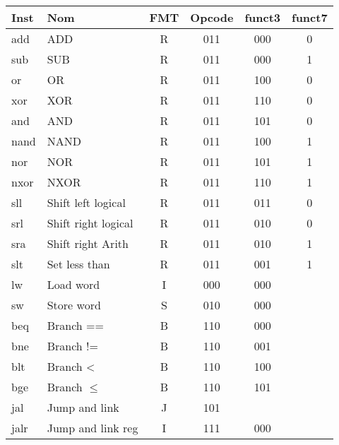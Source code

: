 \documentclass[a4paper]{article}
\begin{document}
    \begin{tabular}{|l|l|c|c|c|c|}
        \hline
        Inst & Nom                  & FMT & Opcode & funct3 & funct7 \\
        \hline
        add  & ADD                  & R   & 011    & 000    & 0      \\
        sub  & SUB                  & R   & 011    & 000    & 1      \\
        or   & OR                   & R   & 011    & 100    & 0      \\
        xor  & XOR                  & R   & 011    & 110    & 0      \\
        and  & AND                  & R   & 011    & 101    & 0      \\
        nand & NAND                 & R   & 011    & 100    & 1      \\
        nor  & NOR                  & R   & 011    & 101    & 1      \\
        nxor & NXOR                 & R   & 011    & 110    & 1      \\
        sll  & Shift left logical   & R   & 011    & 011    & 0      \\
        srl  & Shift right logical  & R   & 011    & 010    & 0      \\
        sra  & Shift right Arith    & R   & 011    & 010    & 1      \\
        slt  & Set less than        & R   & 011    & 001    & 1      \\
        \hline
        lw   & Load word            & I   & 000    & 000    &        \\
        sw   & Store word           & S   & 010    & 000    &        \\
        \hline
        beq  & Branch ==            & B   & 110    & 000    &        \\
        bne  & Branch !=            & B   & 110    & 001    &        \\
        blt  & Branch <             & B   & 110    & 100    &        \\
        bge  & Branch \(\leqslant\) & B   & 110    & 101    &        \\
        \hline
        jal  & Jump and link        & J   & 101    &        &        \\
        jalr & Jump and link reg    & I   & 111    & 000    &        \\
        \hline
    \end{tabular}
\end{document}
